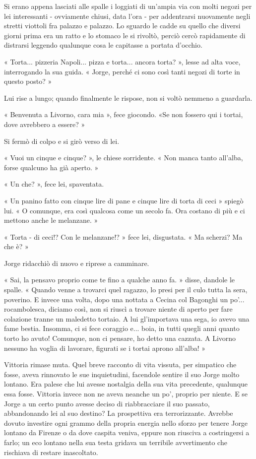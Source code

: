 Si erano appena lasciati alle spalle i loggiati di un'ampia via con molti negozi per lei interessanti - ovviamente chiusi, data l'ora - per addentrarsi nuovamente negli stretti viottoli fra palazzo e palazzo. Lo sguardo le cadde su quello che diversi giorni prima era un ratto e lo stomaco le si rivoltò, perciò cercò rapidamente di distrarsi leggendo qualunque cosa le capitasse a portata d'occhio.

« Torta... pizzeria Napoli... pizza e torta... ancora torta? », lesse ad alta voce, interrogando la sua guida. « Jorge, perché ci sono così tanti negozi di torte in questo posto? »

Lui rise a lungo; quando finalmente le rispose, non si voltò nemmeno a guardarla.

« Benvenuta a Livorno, cara mia », fece giocondo. «Se non fossero qui i tortai, dove avrebbero a essere? »

Si fermò di colpo e si girò verso di lei.

« Vuoi un cinque e cinque? », le chiese sorridente. « Non manca tanto all'alba, forse qualcuno ha già aperto. »

« Un che? », fece lei, spaventata.

« Un panino fatto con cinque lire di pane e cinque lire di torta di ceci » spiegò lui. « O comunque, era così qualcosa come un secolo fa. Ora costano di più e ci mettono anche le melanzane. »

« Torta - di ceci!? Con le melanzane!? » fece lei, disgustata. « Ma scherzi? Ma che è? »

Jorge ridacchiò di nuovo e riprese a camminare.

« Sai, la pensavo proprio come te fino a qualche anno fa. » disse, dandole le spalle. « Quando venne a trovarci quel ragazzo, lo presi per il culo tutta la sera, poverino. E invece una volta, dopo una nottata a Cecina col Bagonghi un po'... rocambolesca, diciamo così, non si riuscì a trovare niente di aperto per fare colazione tranne un maledetto tortaio. A lui gl'importava una sega, io avevo una fame bestia. Insomma, ci si fece coraggio e... boia, in tutti quegli anni quanto torto ho avuto! Comunque, non ci pensare, ho detto una cazzata. A Livorno nessuno ha voglia di lavorare, figurati se i tortai aprono all'alba! »

Vittoria rimase muta. Quel breve racconto di vita vissuta, per simpatico che fosse, aveva rinnovato le sue inquietudini, facendole sentire il suo Jorge molto lontano. Era palese che lui avesse nostalgia della sua vita precedente, qualunque essa fosse. Vittoria invece non ne aveva neanche un po', proprio per niente. E se Jorge a un certo punto avesse deciso di riabbracciare il suo passato, abbandonando lei al suo destino? La prospettiva era terrorizzante. Avrebbe dovuto investire ogni grammo della propria energia nello sforzo per tenere Jorge lontano da Firenze o da dove caspita veniva, eppure non riusciva a costringersi a farlo; un eco lontano nella sua testa gridava un terribile avvertimento che rischiava di restare inascoltato.

